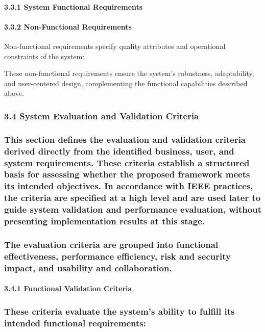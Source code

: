 \documentclass[12pt,a4paper]{report}
\begin{document}
\paragraph{3.3.1 System Functional Requirements}

\paragraph{3.3.2 Non-Functional Requirements}

Non-functional requirements specify quality attributes and operational constraints of the system:

These non-functional requirements ensure the system’s robustness, adaptability, and user-centered design, complementing the functional capabilities described above.

\subsubsection{3.4 System Evaluation and Validation Criteria}

\subsubsection{This section defines the evaluation and validation criteria derived directly from the identified business, user, and system requirements. These criteria establish a structured basis for assessing whether the proposed framework meets its intended objectives. In accordance with IEEE practices, the criteria are specified at a high level and are used later to guide system validation and performance evaluation, without presenting implementation results at this stage.}

\subsubsection{The evaluation criteria are grouped into functional effectiveness, performance efficiency, risk and security impact, and usability and collaboration.}

\paragraph{3.4.1 Functional Validation Criteria}

\subsubsection{These criteria evaluate the system’s ability to fulfill its intended functional requirements:}
\end{document}
